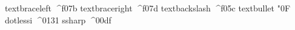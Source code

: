 


\let\typeout\message 



\usetypescript[OmegaArab]
\usetypescript[OmegaLGC]


\startencoding[omega]

   textbraceleft  {^^^^f07b}
   textbraceright {^^^^f07d}
   textbackslash  {^^^^f05c}
   textbullet     {{\clearocplists\mm\sy\char"0F}}
   dotlessi       {^^^^0131}
   ssharp         {^^^^00df}

\stopencoding 

\enableencoding [omega]


\unexpanded {}
\unexpanded {}


\def\#{^^^^f023}
\def\${^^^^f024}
\def\%{^^^^f025}
\def\&{^^^^f026}


\def\heshe {\lohi{he} {she}}
\def\himher{\lohi{him}{her}}
\def\hisher{\lohi{his}{her}}


\setuptolerance [verytolerant]

\endinput
